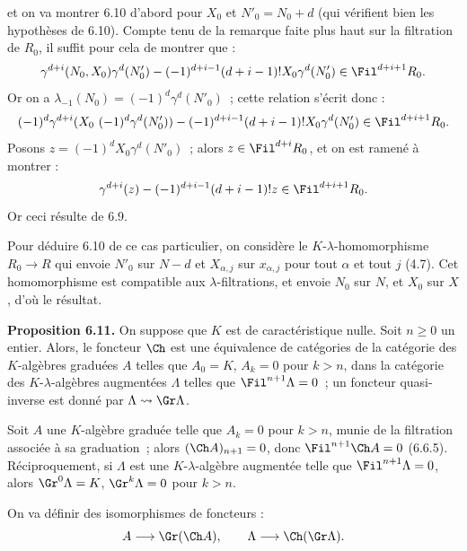 et on va
montrer 6.10 d'abord pour \(X_0\) et \(N'_0=N_0+d\) (qui vérifient bien les hypothèses de 6.10). Compte tenu de la remarque faite plus haut sur la filtration de \(R_0\), il suffit pour cela de montrer que :
\[
  \gamma^{d+i}(N_0,X_0)\gamma^d(N'_0)
  -
  (-1)^{d+i-1}(d+i-1)!X_0\gamma^d(N'_0)
  \in\Fil^{d+i+1}R_0 .
\]
Or on a \(\lambda_{-1}(N_0)=(-1)^d\gamma^d(N'_0)\)~; cette relation s'écrit donc :
\[
  (-1)^d\gamma^{d+i}(X_0\ (-1)^d\gamma^d(N'_0))
  -
  (-1)^{d+i-1}(d+i-1)!X_0\gamma^d(N'_0)
  \in\Fil^{d+i+1}R_0 .
\]
Posons \(z=(-1)^dX_0\gamma^d(N'_0)\)~; alors \(z\in\Fil^{d+i}R_0\), et on est ramené à montrer :
\[
  \gamma^{d+i}(z)-(-1)^{d+i-1}(d+i-1)!z\in\Fil^{d+i+1}R_0 .
\]
Or ceci résulte de 6.9.

Pour déduire 6.10 de ce cas particulier, on considère le \(K\)-\(\lambda\)-homomorphisme \(R_0\to R\) qui envoie \(N'_0\) sur \(N-d\) et \(X_{\alpha,j}\) sur \(x_{\alpha,j}\) pour tout \(\alpha\) et tout \(j\) (4.7). Cet homomorphisme est compatible aux \(\lambda\)-filtrations, et envoie \(N_0\) sur \(N\), et \(X_0\) sur \(X\), d'où le résultat.

\textbf{Proposition 6.11.} On suppose que \(K\) est de caractéristique nulle. Soit \(n\ge0\) un entier. Alors, le foncteur \(\Ch\) est une équivalence de catégories de la catégorie des \(K\)-algèbres graduées \(A\) telles que \(A_0=K\), \(A_k=0\) pour \(k>n\), dans la catégorie des \(K\)-\(\lambda\)-algèbres augmentées \(\Lambda\) telles que \(\Fil^{n+1}\Lambda=0\)~; un foncteur quasi-inverse est donné par \(\Lambda\rightsquigarrow\Gr\Lambda\).

Soit \(A\) une \(K\)-algèbre graduée telle que \(A_k=0\) pour \(k>n\), munie de la filtration associée à sa graduation~; alors \((\Ch A)_{n+1}=0\), donc \(\Fil^{n+1}\Ch A=0\) (6.6.5). Réciproquement, si \(\Lambda\) est une \(K\)-\(\lambda\)-algèbre augmentée telle que \(\Fil^{n+1}\Lambda=0\), alors \(\Gr^0\Lambda=K\), \(\Gr^k\Lambda=0\) pour \(k>n\).

On va définir des isomorphismes de foncteurs :
\[
  A\longrightarrow \Gr(\Ch A),
  \qquad
  \Lambda\longrightarrow \Ch(\Gr\Lambda).
\]
